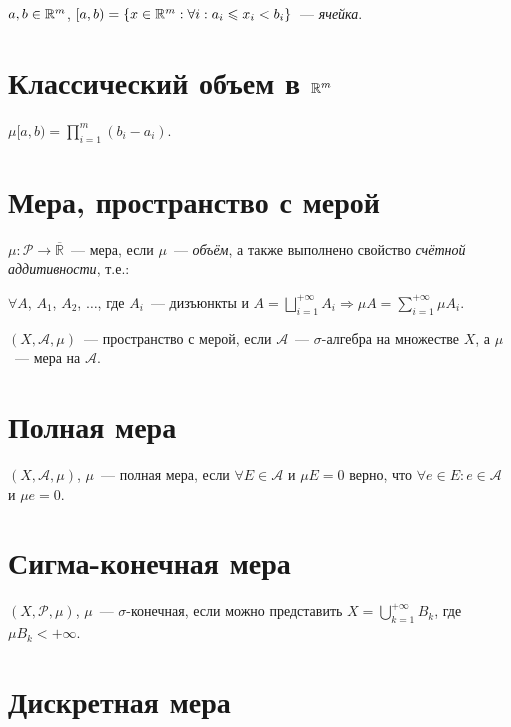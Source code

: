 \documentclass{article}
\begin{document}
        $a, b \in \mathbb{R}^m$, $[a, b) = \left\{ x \in \mathbb{R}^m : \forall i : a_i \leqslant x_i < b_i \right\}$~--- \textit{ячейка}.
        
    \newpage
    
    \section{Классический объем в $\mathbb{R}^m$}
    
        $\mu [a, b) = \prod\limits^m_{i = 1} (b_i - a_i)$.
        
    \newpage
    
    \section{Мера, пространство с мерой}
            
        $\mu : \mathcal{P} \rightarrow \overline{\mathbb{R}}$~--- мера, если $\mu$~--- \textit{объём}, а также выполнено свойство \textit{счётной аддитивности}, т.е.:
        
        $\forall A$, $A_1$, $A_2$, $\ldots$, где $A_i$~--- дизъюнкты и $A = \bigsqcup\limits^{+\infty}_{i = 1} A_i \Rightarrow \mu A = \sum\limits^{+\infty}_{i = 1} \mu A_i$.
        
        $(X, \mathcal{A}, \mu)$~--- пространство с мерой, если $\mathcal{A}$~--- $\sigma$-алгебра на множестве $X$, а $\mu$~--- мера на $\mathcal{A}$.
        
    \newpage
    
    \section{Полная мера}
    
        $(X, \mathcal{A}, \mu)$, $\mu$~--- полная мера, если $\forall E \in \mathcal{A}$ и $\mu E = 0$ верно, что $\forall e \in E : e \in \mathcal{A}$ и $\mu e = 0$.
        
    \newpage
    
    \section{Сигма-конечная мера}
    
        $(X, \mathcal{P}, \mu)$, $\mu$~--- $\sigma$-конечная, если можно представить $X = \bigcup\limits^{+\infty}_{k = 1} B_k$, где $\mu B_k < +\infty$.
        
    \newpage
    
    \section{Дискретная мера}
    
\end{document}
